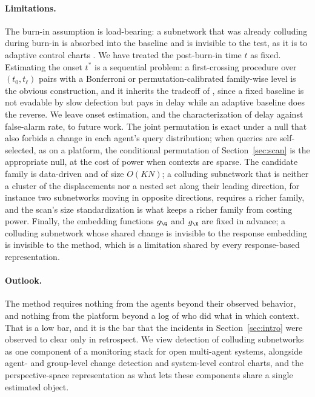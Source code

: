 \paragraph{Limitations.}
The burn-in assumption is load-bearing: a subnetwork that was already colluding during burn-in is absorbed into the baseline and is invisible to the test, as it is to adaptive control charts \citep{helm2026control}. We have treated the post-burn-in time $t$ as fixed. Estimating the onset $t^*$ is a sequential problem: a first-crossing procedure over $(t_0,t_\ell)$ pairs with a Bonferroni or permutation-calibrated family-wise level is the obvious construction, and it inherits the tradeoff of \citet{helm2026control}, since a fixed baseline is not evadable by slow defection but pays in delay while an adaptive baseline does the reverse. We leave onset estimation, and the characterization of delay against false-alarm rate, to future work. The joint permutation is exact under a null that also forbids a change in each agent's query distribution; when queries are self-selected, as on a platform, the conditional permutation of Section~\ref{sec:scan} is the appropriate null, at the cost of power when contexts are sparse. The candidate family is data-driven and of size $O(KN)$; a colluding subnetwork that is neither a cluster of the displacements nor a nested set along their leading direction, for instance two subnetworks moving in opposite directions, requires a richer family, and the scan's size standardization is what keeps a richer family from costing power. Finally, the embedding functions $g_\Q$ and $g_\X$ are fixed in advance; a colluding subnetwork whose shared change is invisible to the response embedding is invisible to the method, which is a limitation shared by every response-based representation.

\paragraph{Outlook.}
The method requires nothing from the agents beyond their observed behavior, and nothing from the platform beyond a log of who did what in which context. That is a low bar, and it is the bar that the incidents in Section~\ref{sec:intro} were observed to clear only in retrospect. We view detection of colluding subnetworks as one component of a monitoring stack for open multi-agent systems, alongside agent- and group-level change detection and system-level control charts, and the perspective-space representation as what lets these components share a single estimated object.
